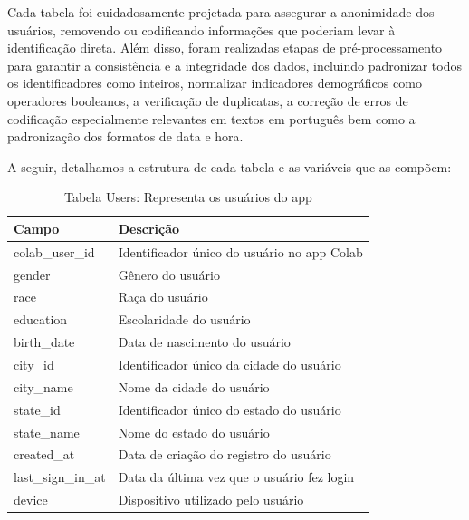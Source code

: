Cada tabela foi cuidadosamente projetada para assegurar a anonimidade dos usuários, removendo ou codificando informações que poderiam levar à identificação direta. Além disso, foram realizadas etapas de pré-processamento para garantir a consistência e a integridade dos dados, incluindo padronizar todos os identificadores como inteiros, normalizar indicadores demográficos como operadores booleanos, a verificação de duplicatas, a correção de erros de codificação especialmente relevantes em textos em português bem como a padronização dos formatos de data e hora.

A seguir, detalhamos a estrutura de cada tabela e as variáveis que as compõem:

\begin{table}[ht]
	\centering
	\caption{Tabela Users: Representa os usuários do app}
	\label{tab:user_model}
	\begin{tabularx}{\textwidth}{|l|X|}
		\hline
		\textbf{Campo}     & \textbf{Descrição}                          \\
		\hline
		colab\_user\_id    & Identificador único do usuário no app Colab \\
		gender             & Gênero do usuário                           \\
		race               & Raça do usuário                             \\
		education          & Escolaridade do usuário                     \\
		birth\_date        & Data de nascimento do usuário               \\
		city\_id           & Identificador único da cidade do usuário    \\
		city\_name         & Nome da cidade do usuário                   \\
		state\_id          & Identificador único do estado do usuário    \\
		state\_name        & Nome do estado do usuário                   \\
		created\_at        & Data de criação do registro do usuário      \\
		last\_sign\_in\_at & Data da última vez que o usuário fez login  \\
		device             & Dispositivo utilizado pelo usuário          \\
		\hline
	\end{tabularx}
\end{table}


